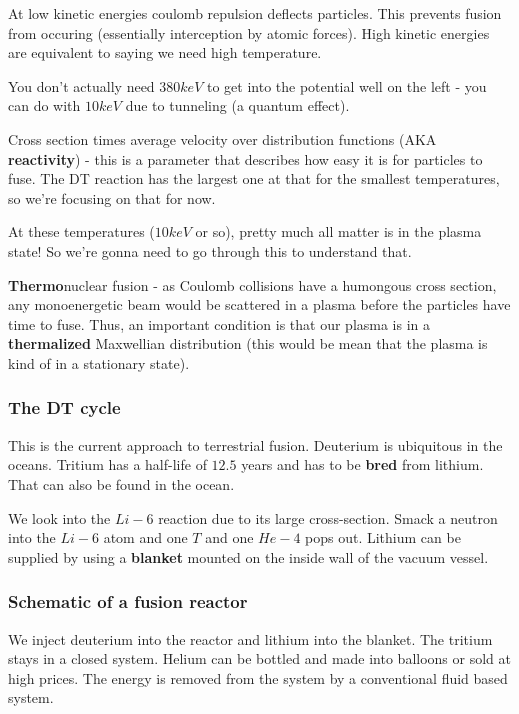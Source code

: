 \documentclass[PlasmaNotes.tex]{subfiles}
\begin{document}
At low kinetic energies coulomb repulsion deflects particles. This prevents fusion from occuring (essentially interception by atomic forces). High kinetic energies are equivalent to saying we need high temperature.

You don't actually need $380 keV$ to get into the potential well on the left - you can do with $10 keV$ due to tunneling (a quantum effect).


Cross section times average velocity over distribution functions (AKA \textbf{reactivity}) - this is a parameter that describes how easy it is for particles to fuse. The DT reaction has the largest one at that for the smallest temperatures, so we're focusing on that for now.

At these temperatures ($10 keV$ or so), pretty much all matter is in the plasma state! So we're gonna need to go through this to understand that.

\textbf{Thermo}nuclear fusion - as Coulomb collisions have a humongous cross section, any monoenergetic beam would be scattered in a plasma before the particles have time to fuse. Thus, an important condition is that our plasma is in a \textbf{thermalized} Maxwellian distribution (this would be mean that the plasma is kind of in a stationary state).

\subsubsection{The DT cycle}

This is the current approach to terrestrial fusion. Deuterium is ubiquitous in the oceans. Tritium has a half-life of $12.5$ years and has to be \textbf{bred} from lithium. That can also be found in the ocean.

We look into the $Li-6$ reaction due to its large cross-section. Smack a neutron into the $Li-6$ atom and one $T$ and one $He-4$ pops out. Lithium can be supplied by using a \textbf{blanket} mounted on the inside wall of the vacuum vessel.

\subsubsection{Schematic of a fusion reactor}

We inject deuterium into the reactor and lithium into the blanket. The tritium stays in a closed system. Helium can be bottled and made into balloons or sold at high prices. The energy is removed from the system by a conventional fluid based system.
\end{document}
